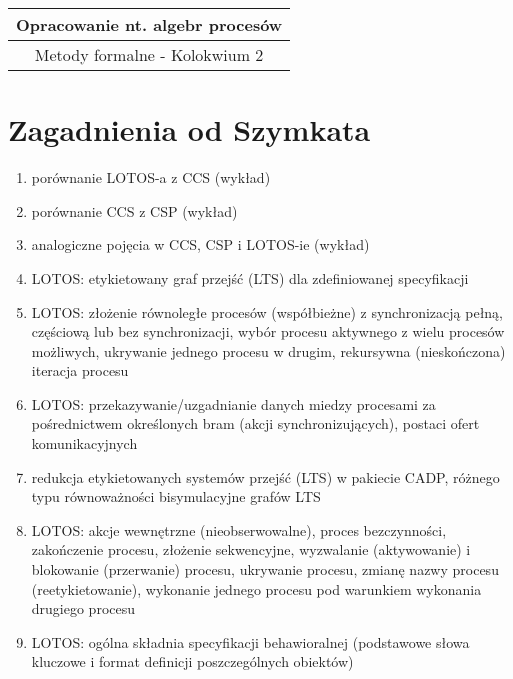 \documentclass[a4paper,15pt]{article}
\begin{document}
\begin{table}
\begin{center}
\begin{tabular}{|c|c|c|}
\hline
\multicolumn{3}{|c|}{\textbf{Opracowanie nt. algebr procesów}} \\ \hline \multicolumn{3}{|c|}{Metody formalne - Kolokwium 2}  \\ \hline
\end{tabular}
\end{center}
\end{table}

\tableofcontents


\newpage

\section{Zagadnienia od Szymkata}

\begin{enumerate}

\item porównanie LOTOS-a z CCS (wykład)

\item porównanie CCS z CSP (wykład)

\item analogiczne pojęcia w CCS, CSP i LOTOS-ie (wykład)

\item LOTOS: etykietowany graf przejść (LTS) dla zdefiniowanej
specyfikacji

\item LOTOS: złożenie równoległe procesów (współbieżne) z synchronizacją
pełną, częściową lub bez synchronizacji, wybór procesu aktywnego z wielu
procesów możliwych, ukrywanie jednego procesu w drugim, rekursywna
(nieskończona) iteracja procesu

\item LOTOS: przekazywanie/uzgadnianie danych miedzy procesami za
pośrednictwem określonych bram (akcji synchronizujących), postaci ofert
komunikacyjnych

\item redukcja etykietowanych systemów przejść (LTS) w pakiecie CADP,
różnego typu równoważności bisymulacyjne grafów LTS

\item LOTOS: akcje wewnętrzne (nieobserwowalne), proces bezczynności,
zakończenie procesu, złożenie sekwencyjne, wyzwalanie (aktywowanie) i
blokowanie (przerwanie) procesu, ukrywanie procesu, zmianę nazwy procesu
(reetykietowanie), wykonanie jednego procesu pod warunkiem wykonania
drugiego procesu

\item LOTOS: ogólna składnia specyfikacji behawioralnej (podstawowe słowa
kluczowe i format definicji poszczególnych obiektów)

\end{enumerate}
\end{document}
